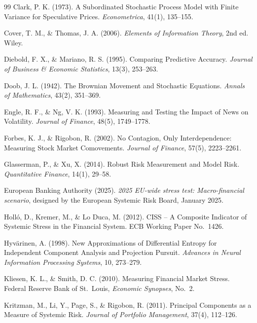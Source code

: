 \documentclass[11pt]{article}
\theoremstyle{definition}
\begin{document}
\begin{thebibliography}{99}
 Clark, P. K. (1973). A Subordinated Stochastic Process Model with Finite Variance for Speculative Prices. \textit{Econometrica}, 41(1), 135--155.

 Cover, T. M., \& Thomas, J. A. (2006). \textit{Elements of Information Theory}, 2nd ed. Wiley.

 Diebold, F. X., \& Mariano, R. S. (1995). Comparing Predictive Accuracy. \textit{Journal of Business \& Economic Statistics}, 13(3), 253--263.

 Doob, J. L. (1942). The Brownian Movement and Stochastic Equations. \textit{Annals of Mathematics}, 43(2), 351--369.

 Engle, R. F., \& Ng, V. K. (1993). Measuring and Testing the Impact of News on Volatility. \textit{Journal of Finance}, 48(5), 1749--1778.

 Forbes, K. J., \& Rigobon, R. (2002). No Contagion, Only Interdependence: Measuring Stock Market Comovements. \textit{Journal of Finance}, 57(5), 2223--2261.

 Glasserman, P., \& Xu, X. (2014). Robust Risk Measurement and Model Risk. \textit{Quantitative Finance}, 14(1), 29--58.

 European Banking Authority (2025). \textit{2025 EU-wide stress test: Macro-financial scenario}, designed by the European Systemic Risk Board, January 2025.

 Holló, D., Kremer, M., \& Lo Duca, M. (2012). CISS -- A Composite Indicator of Systemic Stress in the Financial System. ECB Working Paper No.~1426.

 Hyvärinen, A. (1998). New Approximations of Differential Entropy for Independent Component Analysis and Projection Pursuit. \textit{Advances in Neural Information Processing Systems}, 10, 273--279.

 Kliesen, K. L., \& Smith, D. C. (2010). Measuring Financial Market Stress. Federal Reserve Bank of St.~Louis, \textit{Economic Synopses}, No.~2.

 Kritzman, M., Li, Y., Page, S., \& Rigobon, R. (2011). Principal Components as a Measure of Systemic Risk. \textit{Journal of Portfolio Management}, 37(4), 112--126.


\end{thebibliography}
\end{document}
